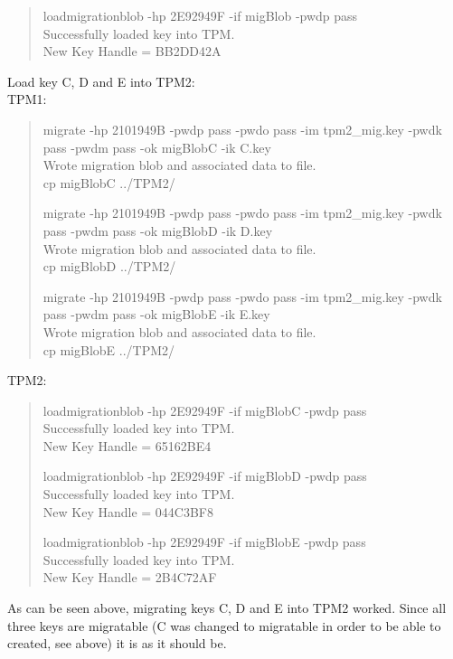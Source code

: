 \documentclass[10pt]{article}
\begin{document}
\begin{quote}
loadmigrationblob -hp 2E92949F -if migBlob -pwdp pass \\
Successfully loaded key into TPM.\\
New Key Handle = BB2DD42A\\
\end{quote}

Load key C, D and E into TPM2:\\
TPM1:
\begin{quote}
migrate -hp 2101949B -pwdp pass -pwdo pass -im tpm2\_mig.key -pwdk pass -pwdm pass -ok migBlobC -ik C.key\\
Wrote migration blob and associated data to file.\\
cp migBlobC ../TPM2/

migrate -hp 2101949B -pwdp pass -pwdo pass -im tpm2\_mig.key -pwdk pass -pwdm pass -ok migBlobD -ik D.key\\
Wrote migration blob and associated data to file.\\
cp migBlobD ../TPM2/

migrate -hp 2101949B -pwdp pass -pwdo pass -im tpm2\_mig.key -pwdk pass -pwdm pass -ok migBlobE -ik E.key\\
Wrote migration blob and associated data to file.\\
cp migBlobE ../TPM2/

\end{quote}
TPM2:
\begin{quote}
loadmigrationblob -hp 2E92949F -if migBlobC -pwdp pass \\
Successfully loaded key into TPM.\\
New Key Handle = 65162BE4

loadmigrationblob -hp 2E92949F -if migBlobD -pwdp pass \\
Successfully loaded key into TPM.\\
New Key Handle = 044C3BF8

loadmigrationblob -hp 2E92949F -if migBlobE -pwdp pass \\
Successfully loaded key into TPM.\\
New Key Handle = 2B4C72AF
\end{quote}

As can be seen above, migrating keys C, D and E into TPM2 worked.
Since all three keys are migratable (C was changed to migratable 
in order to be able to created, see above) it is as it should be.
\end{document}
